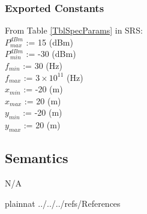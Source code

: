 \documentclass[12pt, titlepage]{article}
\begin{document}
\subsubsection{Exported Constants}

From Table \ref{TblSpecParams} in SRS:\\
  $P_{max}^{dBm}$ := 15 (\si{dBm})\\
  $P_{min}^{dBm}$ := -30 (\si{dBm})\\
  $f_{min}$ := 30 (\si{\hertz})\\
  $f_{max}$ := $3\times 10^{11}$  (\si{\hertz})\\
  $x_{min}$ := -20 (\si{\meter})\\
  $x_{max}$ := 20 (\si{\meter})\\
  $y_{min}$ := -20 (\si{\meter})\\
  $y_{max}$ := 20 (\si{\meter})\\

\subsection{Semantics}
N/A



\newpage

 {plainnat}
 {../../../refs/References}
\end{document}
